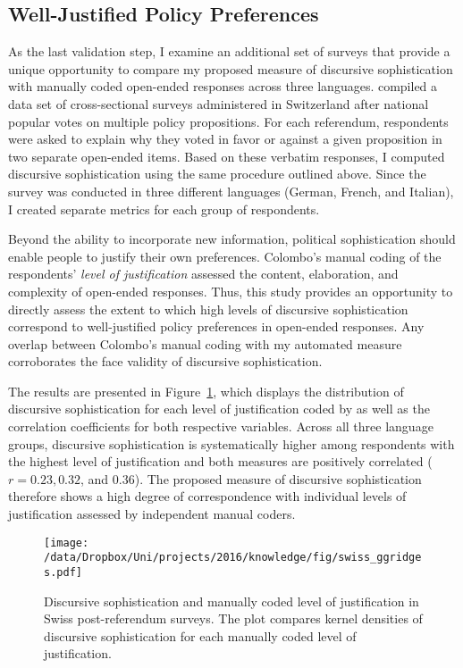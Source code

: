 \subsection*{Well-Justified Policy Preferences}
As the last validation step, I examine an additional set of surveys that provide a unique opportunity to compare my proposed measure of discursive sophistication with manually coded open-ended responses across three languages.  \citet{colombo2016justifications} compiled a data set of cross-sectional surveys administered in Switzerland after national popular votes on multiple policy propositions. For each referendum, respondents were asked to explain why they voted in favor or against a given proposition in two separate open-ended items. Based on these verbatim responses, I computed discursive sophistication using the same procedure outlined above. Since the survey was conducted in three different languages (German, French, and Italian), I created separate metrics for each group of respondents.

Beyond the ability to incorporate new information, political sophistication should enable people to justify their own preferences. Colombo's \citeyearpar{colombo2016justifications} manual coding of the respondents' \textit{level of justification} assessed the content, elaboration, and complexity of open-ended responses. Thus, this study provides an opportunity to directly assess the extent to which high levels of discursive sophistication correspond to well-justified policy preferences in open-ended responses. Any overlap between Colombo's \citeyearpar{colombo2016justifications} manual coding with my automated measure corroborates the face validity of discursive sophistication.

The results are presented in Figure~\ref{fig:swiss_ggridges}, which displays the distribution of discursive sophistication for each level of justification coded by \citet{colombo2016justifications} as well as the correlation coefficients for both respective variables. Across all three language groups, discursive sophistication is systematically higher among respondents with the highest level of justification and both measures are positively correlated ($r=0.23, 0.32$, and $0.36$). The proposed measure of discursive sophistication therefore shows a high degree of correspondence with individual levels of justification assessed by independent manual coders.

\begin{figure}[h]\centering
\texttt{[image: /data/Dropbox/Uni/projects/2016/knowledge/fig/swiss\_ggridges.pdf]}
\caption[Discursive sophistication and manually coded level of justification in Swiss post-referendum surveys]{Discursive sophistication and manually coded level of justification \citep{colombo2016justifications} in Swiss post-referendum surveys. The plot compares kernel densities of discursive sophistication for each manually coded level of justification.}\label{fig:swiss_ggridges}
\end{figure}

